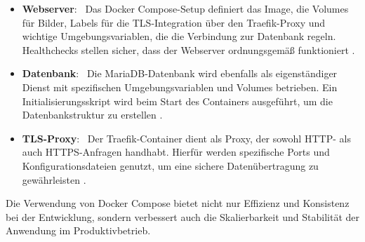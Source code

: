 \begin{itemize}
\item \textbf{Webserver}: \
Das Docker Compose-Setup definiert das Image, die Volumes für Bilder, Labels für die TLS-Integration über den Traefik-Proxy und wichtige Umgebungsvariablen, die die Verbindung zur Datenbank regeln. Healthchecks stellen sicher, dass der Webserver ordnungsgemäß funktioniert \cite{services_docs}.

\item \textbf{Datenbank}: \
Die MariaDB-Datenbank wird ebenfalls als eigenständiger Dienst mit spezifischen Umgebungsvariablen und Volumes betrieben. Ein Initialisierungsskript wird beim Start des Containers ausgeführt, um die Datenbankstruktur zu erstellen \cite{watada2019}.

\item \textbf{TLS-Proxy}: \
Der Traefik-Container dient als Proxy, der sowohl HTTP- als auch HTTPS-Anfragen handhabt. Hierfür werden spezifische Ports und Konfigurationsdateien genutzt, um eine sichere Datenübertragung zu gewährleisten \cite{docker_compose_docs}.
\end{itemize}

Die Verwendung von Docker Compose bietet nicht nur Effizienz und Konsistenz bei der Entwicklung, sondern verbessert auch die Skalierbarkeit und Stabilität der Anwendung im Produktivbetrieb.